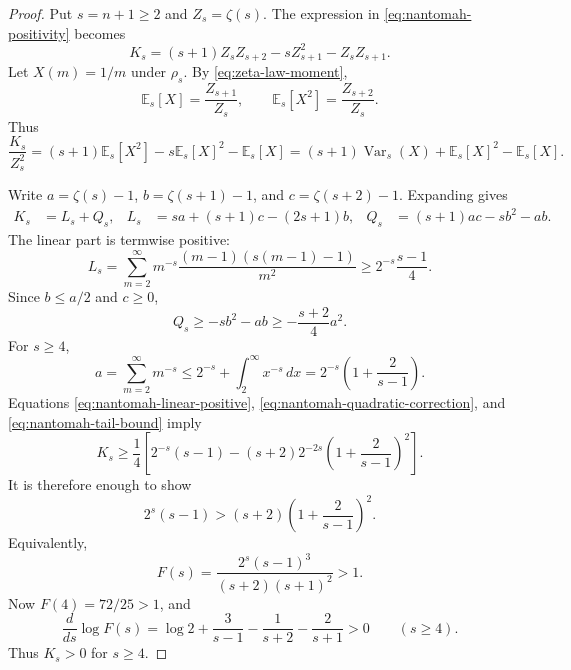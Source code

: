 \documentclass[11pt]{article}
\numberwithin{equation}{section}
\theoremstyle{definition}
\theoremstyle{remark}
\DeclareMathOperator{\Var}{Var}
\newcommand{\E}{\mathbb E}
\newcommand{\1}{\mathbf 1}
\begin{document}
\begin{proof}
Put \(s=n+1\ge2\) and \(Z_s=\zeta(s)\).  The expression in \eqref{eq:nantomah-positivity} becomes
\begin{equation}
\label{eq:nantomah-ks}
K_s=(s+1)Z_sZ_{s+2}-sZ_{s+1}^2-Z_sZ_{s+1}.
\end{equation}
Let \(X(m)=1/m\) under \(\rho_s\).  By \eqref{eq:zeta-law-moment},
\begin{equation}
\label{eq:nantomah-moments}
\E_s[X]=\frac{Z_{s+1}}{Z_s},
\qquad
\E_s[X^2]=\frac{Z_{s+2}}{Z_s}.
\end{equation}
Thus
\begin{equation}
\label{eq:nantomah-moment-form}
\frac{K_s}{Z_s^2}
=(s+1)\E_s[X^2]-s\E_s[X]^2-\E_s[X]
=(s+1)\Var_s(X)+\E_s[X]^2-\E_s[X].
\end{equation}

Write \(a=\zeta(s)-1\), \(b=\zeta(s+1)-1\), and \(c=\zeta(s+2)-1\).  Expanding gives
\begin{align}
\label{eq:nantomah-lq-split}
K_s&=L_s+Q_s,&
L_s&=sa+(s+1)c-(2s+1)b,&
Q_s&=(s+1)ac-sb^2-ab.
\end{align}
The linear part is termwise positive:
\begin{equation}
\label{eq:nantomah-linear-positive}
L_s=
\sum_{m=2}^{\infty}
m^{-s}\frac{(m-1)(s(m-1)-1)}{m^2}
\ge
2^{-s}\frac{s-1}{4}.
\end{equation}
Since \(b\le a/2\) and \(c\ge0\),
\begin{equation}
\label{eq:nantomah-quadratic-correction}
Q_s\ge -sb^2-ab\ge-\frac{s+2}{4}a^2.
\end{equation}
For \(s\ge4\),
\begin{equation}
\label{eq:nantomah-tail-bound}
a=\sum_{m=2}^{\infty}m^{-s}
\le2^{-s}+\int_2^\infty x^{-s}\,dx
=2^{-s}\left(1+\frac2{s-1}\right).
\end{equation}
Equations \eqref{eq:nantomah-linear-positive}, \eqref{eq:nantomah-quadratic-correction}, and \eqref{eq:nantomah-tail-bound} imply
\begin{equation}
\label{eq:nantomah-lower-bound}
K_s\ge
\frac14\left[
2^{-s}(s-1)
-(s+2)2^{-2s}\left(1+\frac2{s-1}\right)^2
\right].
\end{equation}
It is therefore enough to show
\begin{equation}
\label{eq:nantomah-sufficient-inequality}
2^s(s-1)>(s+2)\left(1+\frac2{s-1}\right)^2.
\end{equation}
Equivalently,
\begin{equation}
\label{eq:nantomah-f-function}
F(s)=\frac{2^s(s-1)^3}{(s+2)(s+1)^2}>1.
\end{equation}
Now \(F(4)=72/25>1\), and
\begin{equation}
\label{eq:nantomah-f-monotone}
\frac{d}{ds}\log F(s)
=\log2+\frac3{s-1}-\frac1{s+2}-\frac2{s+1}>0
\qquad(s\ge4).
\end{equation}
Thus \(K_s>0\) for \(s\ge4\).


\end{proof}
\end{document}
